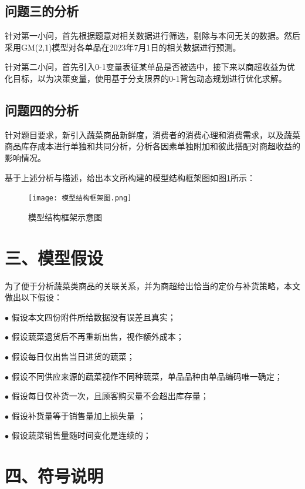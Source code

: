 \documentclass{my_paper}
\begin{document}
\subsection{问题三的分析}
针对第一小问，首先根据题意对相关数据进行筛选，剔除与本问无关的数据。然后采用GM(2,1)模型对各单品在2023年7月1日的相关数据进行预测。\par
针对第二小问，首先引入0-1变量表征某单品是否被选中，接下来以商超收益为优化目标，以为决策变量，使用基于分支限界的0-1背包动态规划进行优化求解。
\subsection{问题四的分析}
针对题目要求，新引入蔬菜商品新鲜度\cite{gu2023}，消费者的消费心理和消费需求，以及蔬菜商品库存成本进行单独和共同分析，分析各因素单独附加和彼此搭配对商超收益的影响情况。\par
基于上述分析与描述，给出本文所构建的模型结构框架图如图\ref{模型结构框架图}所示：
\begin{figure}[H]
 \centering
 \texttt{[image: 模型结构框架图.png]} %
 \caption{模型结构框架示意图} %
 \label{模型结构框架图} %
\end{figure}\par
\section{三、模型假设}
为了便于分析蔬菜类商品的关联关系，并为商超给出恰当的定价与补货策略，本文做出以下假设：
\noindent\par
$\bullet$ 假设本文四份附件所给数据没有误差且真实；\par
$\bullet$ 假设蔬菜退货后不再重新出售，视作额外成本；\par
$\bullet$ 假设每日仅出售当日进货的蔬菜；\par
$\bullet$ 假设不同供应来源的蔬菜视作不同种蔬菜，单品品种由单品编码唯一确定；\par
$\bullet$ 假设每日仅补货一次，且顾客购买量不会超出库存量；\par
$\bullet$ 假设补货量等于销售量加上损失量 ；\par
$\bullet$ 假设蔬菜销售量随时间变化是连续的；\par

\section{四、符号说明}
\end{document}
